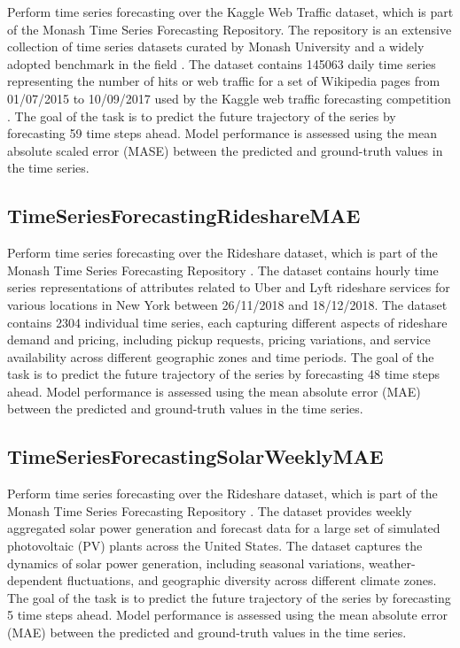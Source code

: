 \documentclass{fairmeta}
\begin{document}
Perform time series forecasting over the Kaggle Web Traffic dataset, which is part of the Monash Time Series Forecasting Repository. The repository is an extensive collection of time series datasets curated by Monash University and a widely adopted benchmark in the field \citep{godahewa2021monash}. The dataset contains 145063 daily time series representing the number of hits or web traffic for a set of Wikipedia pages from 01/07/2015 to 10/09/2017 used by the Kaggle web traffic forecasting competition \citep{maggie2017webtraffic}. The goal of the task is to predict the future trajectory of the series by forecasting 59 time steps ahead. Model performance is assessed using the mean absolute scaled error (MASE)  between the predicted and ground-truth values in the time series.


\subsection{TimeSeriesForecastingRideshareMAE}

Perform time series forecasting over the Rideshare dataset, which is part of the Monash Time Series Forecasting Repository \citep{godahewa2021monash}. The dataset contains hourly time series representations of attributes related to Uber and Lyft rideshare services for various locations in New York between 26/11/2018 and 18/12/2018. The dataset contains 2304 individual time series, each capturing different aspects of rideshare demand and pricing, including pickup requests, pricing variations, and service availability across different geographic zones and time periods. The goal of the task is to predict the future trajectory of the series by forecasting 48 time steps ahead. Model performance is assessed using the mean absolute error (MAE)  between the predicted and ground-truth values in the time series.

\subsection{TimeSeriesForecastingSolarWeeklyMAE}

Perform time series forecasting over the Rideshare dataset, which is part of the Monash Time Series Forecasting Repository \citep{godahewa2021monash}. The dataset provides weekly aggregated solar power generation and forecast data for a large set of simulated photovoltaic (PV) plants across the United States. The dataset captures the dynamics of solar power generation, including seasonal variations, weather-dependent fluctuations, and geographic diversity across different climate zones. The goal of the task is to predict the future trajectory of the series by forecasting 5 time steps ahead. Model performance is assessed using the mean absolute error (MAE)  between the predicted and ground-truth values in the time series.
\end{document}
